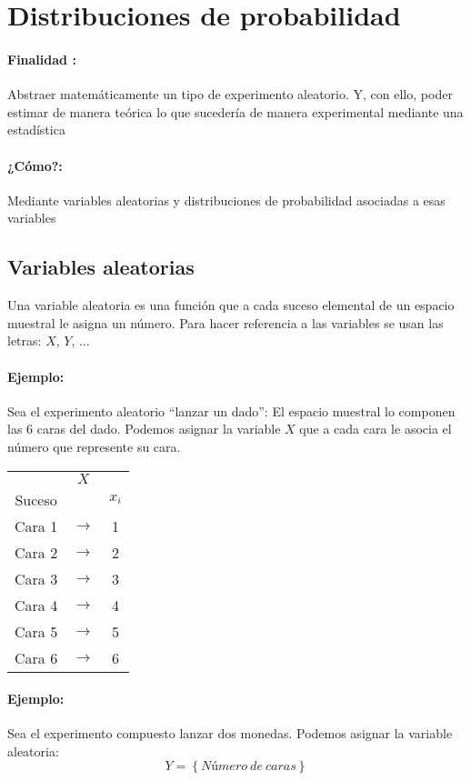 \section{Distribuciones de probabilidad}

\paragraph{Finalidad :} Abstraer matemáticamente un tipo de experimento aleatorio. Y, con ello, poder estimar de manera teórica lo que sucedería de manera experimental mediante una estadística 

\paragraph{¿Cómo?:} Mediante variables aleatorias y distribuciones de probabilidad asociadas a esas variables

\subsection{Variables aleatorias} Una variable aleatoria es una función que a cada suceso
elemental de un espacio muestral le asigna un número. Para hacer referencia a las variables se usan las letras: $X$, $Y$, ...

\paragraph{Ejemplo:} Sea el experimento aleatorio “lanzar un dado”: El espacio muestral lo componen las 6 caras del dado. Podemos asignar la variable $X$ que a cada cara le asocia el número que represente su cara.

\begin{center}
\begin{tabular}{ccc}
 & $X$ &  \\
Suceso &  &  $x_i$\\ \hline 
Cara 1 & $\rightarrow$ & 1 \\ 
Cara 2 & $\rightarrow$ & 2 \\ 
Cara 3 & $\rightarrow$ & 3 \\ 
Cara 4 & $\rightarrow$ & 4 \\ 
Cara 5 & $\rightarrow$ & 5 \\ 
Cara 6 & $\rightarrow$ & 6 \\ 
\end{tabular} 
\end{center}

\paragraph{Ejemplo:} Sea el experimento compuesto lanzar dos monedas. Podemos asignar la variable aleatoria: $$Y=\left\lbrace Número \ de \ caras \right\rbrace$$

